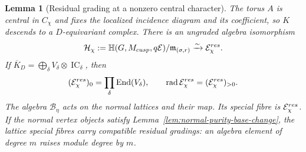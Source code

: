 \documentclass[10pt,a4paper]{amsart}
\newtheorem{lemma}[theorem]{Lemma}
\newcommand{\IC}{\operatorname{IC}}
\begin{document}
\begin{lemma}[Residual grading at a nonzero central character]
\label{lem:residual-grading}
The torus $A$ is central in $C_\chi$ and fixes the localized incidence
diagram and its coefficient, so $K$ descends to a $D$-equivariant complex.
There is an ungraded algebra isomorphism
\[
 \mathcal H_\chi:=
 \mathbb H(G,M_{\rm cusp},q\mathcal E)/\mathfrak m_{(\sigma,r)}
 \xrightarrow{\sim}\mathcal E_\chi^{\rm res}.
\]
If $\overline K_D=\bigoplus_\delta V_\delta\otimes\IC_\delta$, then
\[
 (\mathcal E_\chi^{\rm res})_0
   =\prod_\delta\operatorname{End}(V_\delta),\qquad
 \operatorname{rad}\mathcal E_\chi^{\rm res}
   =(\mathcal E_\chi^{\rm res})_{>0}.
\]
The algebra $\mathcal B_\eta$ acts on the normal lattices and their map.
Its special fibre is $\mathcal E_\chi^{\rm res}$.
If the normal vertex objects satisfy
Lemma~\ref{lem:normal-purity-base-change}, the lattice special fibres
carry compatible residual gradings: an algebra element of degree $m$
raises module degree by $m$.
\end{lemma}
\end{document}
